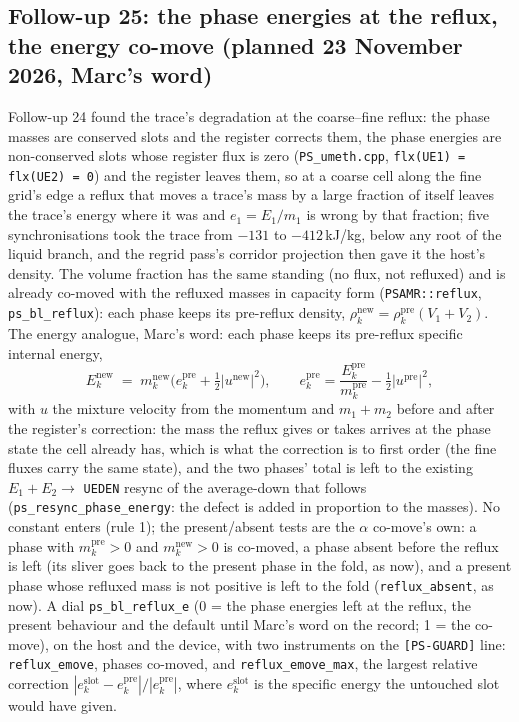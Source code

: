 \documentclass[11pt,a4paper]{article}
\newcommand{\code}[1]{\texttt{\small #1}}
\begin{document}
\subsection*{Follow-up 25: the phase energies at the reflux, the energy co-move (planned 23 November 2026, Marc's word)}

Follow-up 24 found the trace's degradation at the coarse--fine reflux:
the phase masses are conserved slots and the register corrects them,
the phase energies are non-conserved slots whose register flux is zero
(\code{PS\_umeth.cpp}, \code{flx(UE1) = flx(UE2) = 0}) and the register
leaves them, so at a coarse cell along the fine grid's edge a reflux
that moves a trace's mass by a large fraction of itself leaves the
trace's energy where it was and $e_1 = E_1/m_1$ is wrong by that
fraction; five synchronisations took the trace from $-131$ to
$-412$\,kJ/kg, below any root of the liquid branch, and the regrid
pass's corridor projection then gave it the host's density.  The
volume fraction has the same standing (no flux, not refluxed) and is
already co-moved with the refluxed masses in capacity form
(\code{PSAMR::reflux}, \code{ps\_bl\_reflux}): each phase keeps its
pre-reflux density, $\rho_k^{\mathrm{new}} = \rho_k^{\mathrm{pre}}
(V_1+V_2)$.  The energy analogue, Marc's word: each phase keeps its
pre-reflux specific internal energy,
\[
  E_k^{\mathrm{new}} \;=\; m_k^{\mathrm{new}}
  \bigl(e_k^{\mathrm{pre}} + \tfrac12 |u^{\mathrm{new}}|^2\bigr),
  \qquad
  e_k^{\mathrm{pre}} = \frac{E_k^{\mathrm{pre}}}{m_k^{\mathrm{pre}}}
                       - \tfrac12 |u^{\mathrm{pre}}|^2 ,
\]
with $u$ the mixture velocity from the momentum and $m_1 + m_2$ before
and after the register's correction: the mass the reflux gives or
takes arrives at the phase state the cell already has, which is what
the correction is to first order (the fine fluxes carry the same
state), and the two phases' total is left to the existing
$E_1 + E_2 \to$ \code{UEDEN} resync of the average-down that follows
(\code{ps\_resync\_phase\_energy}: the defect is added in proportion to
the masses).  No constant enters (rule 1); the present/absent tests are
the $\alpha$ co-move's own: a phase with $m_k^{\mathrm{pre}} > 0$ and
$m_k^{\mathrm{new}} > 0$ is co-moved, a phase absent before the reflux
is left (its sliver goes back to the present phase in the fold, as
now), and a present phase whose refluxed mass is not positive is left
to the fold (\code{reflux\_absent}, as now).  A dial
\code{ps\_bl\_reflux\_e} (0 = the phase energies left at the reflux,
the present behaviour and the default until Marc's word on the record;
1 = the co-move), on the host and the device, with two instruments on
the \code{[PS-GUARD]} line: \code{reflux\_emove}, phases co-moved, and
\code{reflux\_emove\_max}, the largest relative correction
$|e_k^{\mathrm{slot}} - e_k^{\mathrm{pre}}| / |e_k^{\mathrm{pre}}|$, where
$e_k^{\mathrm{slot}}$ is the specific energy the untouched slot would
have given.
\end{document}
